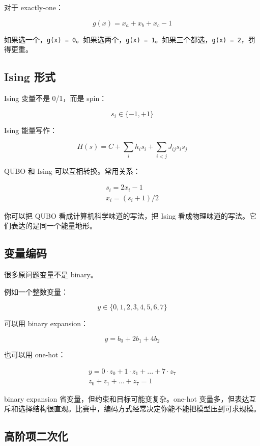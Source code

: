 \documentclass[UTF8,12pt,a4paper]{ctexart}
\begin{document}
对于 exactly-one：

\[
g(x) = x_{a} + x_{b} + x_{c} - 1
\]

如果选一个，\texttt{g(x) = 0}。如果选两个，\texttt{g(x) = 1}。如果三个都选，\texttt{g(x) = 2}，罚得更重。

\subsection*{Ising 形式}

Ising 变量不是 0/1，而是 spin：

\[
s_{i} \in \{-1, +1\}
\]

Ising 能量写作：

\[
H(s) = C + \sum_{i} h_{i} s_{i} + \sum_{i<j} J_{ij} s_{i} s_{j}
\]

QUBO 和 Ising 可以互相转换。常用关系：

\[
\begin{aligned}
s_{i} = 2 x_{i} - 1\\
x_{i} = (s_{i} + 1) / 2
\end{aligned}
\]

你可以把 QUBO 看成计算机科学味道的写法，把 Ising 看成物理味道的写法。它们表达的是同一个能量地形。

\subsection*{变量编码}

很多原问题变量不是 binary。

例如一个整数变量：

\[
y \in \{0, 1, 2, 3, 4, 5, 6, 7\}
\]

可以用 binary expansion：

\[
y = b_{0} + 2 b_{1} + 4 b_{2}
\]

也可以用 one-hot：

\[
\begin{aligned}
y = 0\cdot z_{0} + 1\cdot z_{1} + ... + 7\cdot z_{7}\\
z_{0} + z_{1} + ... + z_{7} = 1
\end{aligned}
\]

binary expansion 省变量，但约束和目标可能变复杂。one-hot 变量多，但表达互斥和选择结构很直观。比赛中，编码方式经常决定你能不能把模型压到可求规模。

\subsection*{高阶项二次化}
\end{document}
